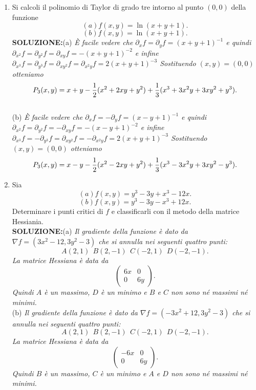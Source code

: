 \documentclass[12pt,a4paper]{report}\pagenumbering{roman}
\begin{document}
\begin{enumerate}
\item Si calcoli il polinomio di Taylor di grado tre intorno al punto $(0,0)$
della funzione 
$$(a) f(x,y)=\ln(x+y+1).$$
$$(b) f(x,y)=\ln(x+y+1).$$
{\bf SOLUZIONE:}(a) {\it \`E facile vedere che $\partial_xf=\partial_yf=(x+y+1)^{-1}$
e quindi $\partial_{x^2}f=\partial_{y^2}f=\partial_{xy}f=-(x+y+1)^{-2}$ e infine
$\partial_{x^3}f=\partial_{y^3}f=\partial_{xy^2}f=\partial_{x^2y}f=2(x+y+1)^{-3}$
Sostituendo $(x,y)=(0,0)$ otteniamo
$$P_3(x,y)=x+y-{1\over2}(x^2+2xy+y^2)+{1\over3}(x^3+3x^2y+3xy^2+y^3).$$
}\\
(b) {\it \`E facile vedere che $\partial_xf=-\partial_yf=(x-y+1)^{-1}$
e quindi $\partial_{x^2}f=\partial_{y^2}f=-\partial_{xy}f=-(x-y+1)^{-2}$ e infine
$\partial_{x^3}f=-\partial_{y^3}f=\partial_{xy^2}f=-\partial_{x^2y}f=2(x+y+1)^{-3}$
Sostituendo $(x,y)=(0,0)$ otteniamo
$$P_3(x,y)=x-y-{1\over2}(x^2-2xy+y^2)+{1\over3}(x^3-3x^2y+3xy^2-y^3).$$
}
\item Sia 
$$(a) f(x,y)=y^3-3y+x^3-12x.$$
$$(b) f(x,y)=y^3-3y-x^3+12x.$$
Determinare i punti critici di 
$f$ e classificarli con il metodo della matrice Hessiania.\\
{\bf SOLUZIONE:}(a) {\it Il gradiente della funzione \`e dato da
$\nabla f=(3x^2-12,3y^2-3)$ che si annulla nei seguenti quattro punti:
$$A(2,1)\ \ B(2,-1)\ \ C(-2,1)\ \ D(-2,-1).$$
La matrice Hessiana \`e data da
$$\left(\begin{array}{ll} 6x& 0\\ 0& 6y\end{array}\right).$$
Quindi $A$ \`e un massimo, $D$ \`e un minimo e $B$ e $C$ non sono n\'e massimi
n\'e minimi.}\\
(b) {\it Il gradiente della funzione \`e dato da
$\nabla f=(-3x^2+12,3y^2-3)$ che si annulla nei seguenti quattro punti:
$$A(2,1)\ \ B(2,-1)\ \ C(-2,1)\ \ D(-2,-1).$$
La matrice Hessiana \`e data da
$$\left(\begin{array}{ll} -6x& 0\\ 0& 6y\end{array}\right).$$
Quindi $B$ \`e un massimo, $C$ \`e un minimo e $A$ e $D$ non sono n\'e massimi
n\'e minimi.}


\end{enumerate}
\end{document}
